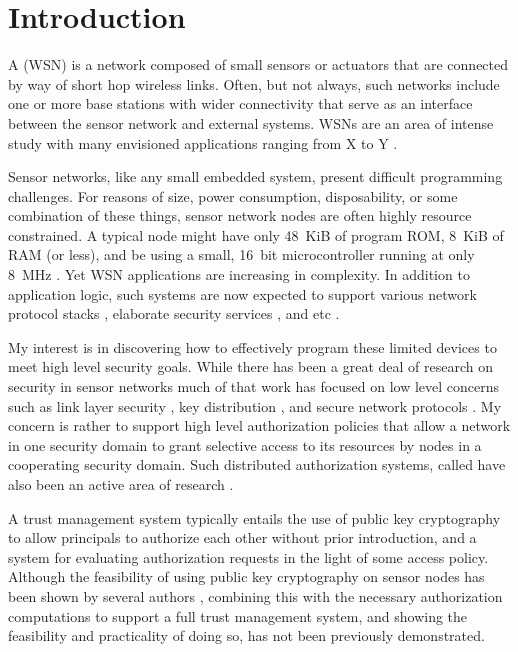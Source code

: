 \chapter{Introduction}
\label{chapter-introduction}

A  (WSN) is a network composed of small sensors or actuators
that are connected by way of short hop wireless links. Often, but not always, such networks
include one or more base stations with wider connectivity that serve as an interface between the
sensor network and external systems. WSNs are an area of intense study with many envisioned
applications ranging from X to Y \cite{XXX}.

Sensor networks, like any small embedded system, present difficult programming challenges. For
reasons of size, power consumption, disposability, or some combination of these things, sensor
network nodes are often highly resource constrained. A typical node might have only 48~KiB of
program ROM, 8~KiB of RAM (or less), and be using a small, 16~bit microcontroller running at
only 8~MHz \cite{tmotesky-datasheet}. Yet WSN applications are increasing in complexity. In
addition to application logic, such systems are now expected to support various network protocol
stacks \cite{XXX}, elaborate security services \cite{XXX}, and etc \cite{XXX}.

My interest is in discovering how to effectively program these limited devices to meet high
level security goals. While there has been a great deal of research on security in sensor
networks much of that work has focused on low level concerns such as link layer security
\cite{XXX}, key distribution \cite{XXX}, and secure network protocols \cite{1049776,XXX}. My
concern is rather to support high level authorization policies that allow a network in one
security domain to grant selective access to its resources by nodes in a cooperating security
domain. Such distributed authorization systems, called  have
also been an active area of research \cite{chapin-skalka-wang-acmcs08}.

A trust management system typically entails the use of public key cryptography to allow
principals to authorize each other without prior introduction, and a system for evaluating
authorization requests in the light of some access policy. Although the feasibility of using
public key cryptography on sensor nodes has been shown by several authors
\cite{bertoni-2006,Liu-Peng-TinyECC-2008,Szczechowiak:2008:NTL:1786014.1786040}, combining this
with the necessary authorization computations to support a full trust management system, and
showing the feasibility and practicality of doing so, has not been previously demonstrated.

